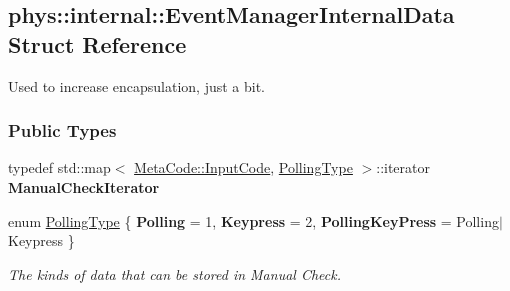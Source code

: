 \hypertarget{structphys_1_1internal_1_1EventManagerInternalData}{
\subsection{phys::internal::EventManagerInternalData Struct Reference}
\label{structphys_1_1internal_1_1EventManagerInternalData}
}


Used to increase encapsulation, just a bit.  


\subsubsection*{Public Types}
\begin{DoxyCompactItemize}
\item 
\hypertarget{structphys_1_1internal_1_1EventManagerInternalData_ad2b9c7924f32e299846f1d945cb82dc0}{
typedef std::map$<$ \hyperlink{classphys_1_1MetaCode_a3e501cbb5bf0f6f1fdb7211465bda8d8}{MetaCode::InputCode}, \hyperlink{structphys_1_1internal_1_1EventManagerInternalData_ab9ab8380b84448aacf46a63050e159af}{PollingType} $>$::iterator {\bfseries ManualCheckIterator}}
\label{structphys_1_1internal_1_1EventManagerInternalData_ad2b9c7924f32e299846f1d945cb82dc0}

\item 
enum \hyperlink{structphys_1_1internal_1_1EventManagerInternalData_ab9ab8380b84448aacf46a63050e159af}{PollingType} \{ {\bfseries Polling} = 1, 
{\bfseries Keypress} = 2, 
{\bfseries PollingKeyPress} =  Polling$|$Keypress
 \}
\begin{DoxyCompactList}\small\item\em The kinds of data that can be stored in Manual Check. \item\end{DoxyCompactList}\end{DoxyCompactItemize}
